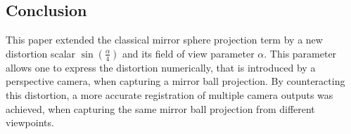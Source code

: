 \documentclass[10pt]{article}
\begin{document}
\begin{multicols}{2}
\section{Conclusion}
This paper extended the classical mirror sphere projection term by a new distortion scalar $\sin{\left(\frac{\alpha}{4}\right)}$ and its field of view parameter $\alpha$. This parameter allows one to express the distortion numerically, that is introduced by a perspective camera, when capturing a mirror ball projection. By counteracting this distortion, a more accurate registration of multiple camera outputs was achieved, when capturing the same mirror ball projection from different viewpoints.



\end{multicols}
\end{document}
